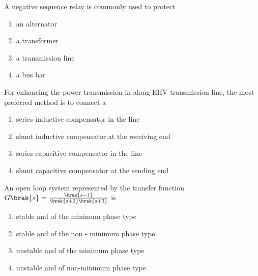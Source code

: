 \begin{enumerate}
%
\end{enumerate}
\item A negative sequence relay is commonly used to protect 
\begin{enumerate}
    \item an alternator
    \item a transformer
    \item a transmission line
    \item a bus bar \\
\end{enumerate}
\item For enhancing the power transmission in along EHV transmission line, the most preferred method is to connect a 
\begin{enumerate}
    \item series inductive compensator in the line
    \item shunt inductive compensator at the receiving end 
    \item series capacitive compensator in the line
    \item shunt capacitive compensator at the sending end \\
\end{enumerate}
\item An open loop system represented by the transfer function $G\brak{s} = \frac{\brak{s-1}}{\brak{s+2}\brak{s+3}}$ is
 \begin{enumerate}
    \item stable and of the minimum phase type
    \item stable and of the non - minimum phase type 
    \item unstable and of the minimum phase type 
    \item unstable and of non-minimum phase type  \\
 \end{enumerate}
